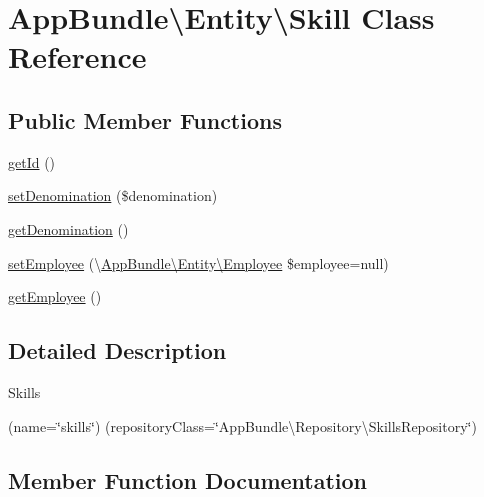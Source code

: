 \hypertarget{class_app_bundle_1_1_entity_1_1_skill}{}\section{App\+Bundle\textbackslash{}Entity\textbackslash{}Skill Class Reference}
\label{class_app_bundle_1_1_entity_1_1_skill}
\subsection*{Public Member Functions}
\begin{DoxyCompactItemize}
\item 
\mbox{\hyperlink{class_app_bundle_1_1_entity_1_1_skill_a46db4431c15f4d2a9a7e2a8055cfbd15}{get\+Id}} ()
\item 
\mbox{\hyperlink{class_app_bundle_1_1_entity_1_1_skill_ac6d7d4286476c5d583d190533e9425a6}{set\+Denomination}} (\$denomination)
\item 
\mbox{\hyperlink{class_app_bundle_1_1_entity_1_1_skill_a32de8d5ba9615669a191a77cec3bbf48}{get\+Denomination}} ()
\item 
\mbox{\hyperlink{class_app_bundle_1_1_entity_1_1_skill_a8c92b9e81fa71efafd400645b4adb1b8}{set\+Employee}} (\textbackslash{}\mbox{\hyperlink{class_app_bundle_1_1_entity_1_1_employee}{App\+Bundle\textbackslash{}\+Entity\textbackslash{}\+Employee}} \$employee=null)
\item 
\mbox{\hyperlink{class_app_bundle_1_1_entity_1_1_skill_a51b3c9c44296f130bd2a988e1f399fc2}{get\+Employee}} ()
\end{DoxyCompactItemize}


\subsection{Detailed Description}
Skills

(name=\char`\"{}skills\char`\"{}) (repository\+Class=\char`\"{}\+App\+Bundle\textbackslash{}\+Repository\textbackslash{}\+Skills\+Repository\char`\"{}) 

\subsection{Member Function Documentation}
\mbox{\label{class_app_bundle_1_1_entity_1_1_skill_a32de8d5ba9615669a191a77cec3bbf48}} 
